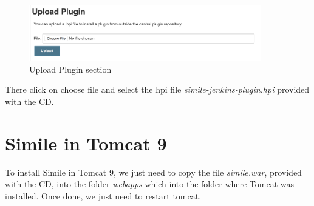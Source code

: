 \begin{figure}[H]
	\centering
    \includegraphics[width=0.9\textwidth]{grafiken/jenkins-plugin-03}
    \caption{Upload Plugin section}
    \label{fig:jenkins-plugin-03}
\end{figure}

There click on choose file and select the hpi file \emph{simile-jenkins-plugin.hpi} provided with the CD.

\section{Simile in Tomcat 9}
To install Simile in Tomcat 9, we just need to copy the file \emph{simile.war}, provided with the CD, into the folder \emph{webapps} which into the folder where Tomcat was installed. Once done, we just need to restart tomcat.